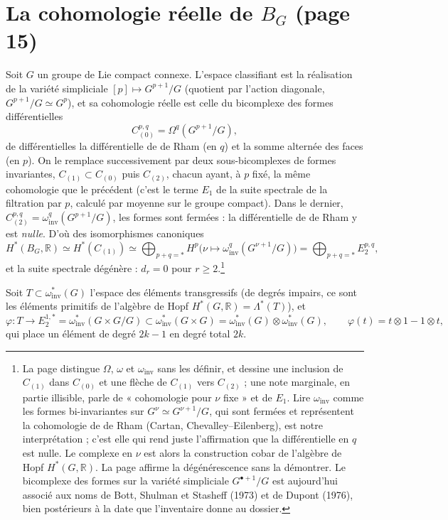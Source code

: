 \documentclass[11pt,a4paper]{article}
\begin{document}
\section*{La cohomologie réelle de $B_{G}$ (page 15)}

Soit $G$ un groupe de Lie compact connexe. L'espace classifiant est la
réalisation de la variété simpliciale $[p] \mapsto G^{p+1}/G$ (quotient par
l'action diagonale, $G^{p+1}/G \simeq G^{p}$), et sa cohomologie réelle est
celle du bicomplexe des formes différentielles
\[
  C_{(0)}^{p,q} = \Omega^{q}(G^{p+1}/G),
\]
de différentielles la différentielle de de Rham (en $q$) et la somme alternée
des faces (en $p$). On le remplace successivement par deux sous-bicomplexes de
formes invariantes, $C_{(1)} \subset C_{(0)}$ puis $C_{(2)}$, chacun ayant, à
$p$ fixé, la même cohomologie que le précédent (c'est le terme $E_{1}$ de
la suite spectrale de la filtration par $p$, calculé par moyenne sur le groupe
compact). Dans le dernier, $C_{(2)}^{p,q} = \omega_{\mathrm{inv}}^{q}
(G^{p+1}/G)$, les formes sont fermées : la différentielle de de Rham y est
\emph{nulle}. D'où des isomorphismes canoniques
\[
  H^{*}(B_{G},\mathbb{R}) \simeq H^{*}(C_{(1)}) \simeq
  \bigoplus_{p+q = *} H^{p}\bigl(\nu \mapsto \omega_{\mathrm{inv}}^{q}(G^{\nu+1}/G)\bigr)
  = \bigoplus_{p+q = *} E_{2}^{p,q},
\]
et la suite spectrale dégénère : $d_{r} = 0$ pour $r \geq 2$.\footnote{La page
distingue $\Omega$, $\omega$ et $\omega_{\mathrm{inv}}$ sans les définir, et
dessine une inclusion de $C_{(1)}$ dans $C_{(0)}$ et une flèche de $C_{(1)}$
vers $C_{(2)}$ ; une note marginale, en partie illisible, parle de
« cohomologie pour $\nu$ fixe » et de $E_{1}$. Lire $\omega_{\mathrm{inv}}$
comme les formes bi-invariantes sur $G^{\nu} \simeq G^{\nu+1}/G$, qui sont
fermées et représentent la cohomologie de de Rham (Cartan, Chevalley--Eilenberg),
est notre interprétation ; c'est elle qui rend juste l'affirmation que la
différentielle en $q$ est nulle. Le complexe en $\nu$ est alors la
construction cobar de l'algèbre de Hopf $H^{*}(G,\mathbb{R})$. La page
affirme la dégénérescence sans la démontrer. Le bicomplexe des formes sur la
variété simpliciale $G^{\bullet+1}/G$ est aujourd'hui associé aux noms de
Bott, Shulman et Stasheff (1973) et de Dupont (1976), bien postérieurs à la
date que l'inventaire donne au dossier.}

Soit $T \subset \omega_{\mathrm{inv}}^{*}(G)$ l'espace des éléments
transgressifs (de degrés impairs, ce sont les éléments primitifs de
l'algèbre de Hopf $H^{*}(G,\mathbb{R}) = \Lambda^{*}(T)$), et
\[
  \varphi : T \to E_{2}^{1,*} = \omega_{\mathrm{inv}}^{*}(G \times G/G)
  \subset \omega_{\mathrm{inv}}^{*}(G \times G) = \omega_{\mathrm{inv}}^{*}(G)
  \otimes \omega_{\mathrm{inv}}^{*}(G), \qquad
  \varphi(t) = t \otimes 1 - 1 \otimes t ,
\]
qui place un élément de degré $2k - 1$ en degré total $2k$.
\end{document}
